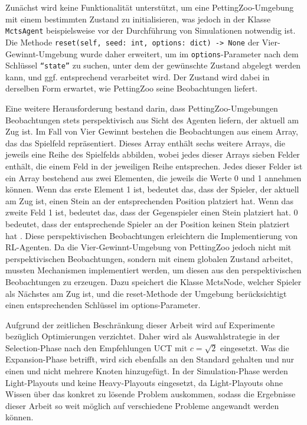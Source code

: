 Zunächst wird keine Funktionalität unterstützt, um eine PettingZoo-Umgebung mit einem bestimmten Zustand zu initialisieren, was jedoch in der Klasse \texttt{MctsAgent} beispielsweise vor der Durchführung von Simulationen notwendig ist. Die Methode \texttt{reset(self, seed: int, options: dict) -> None} der Vier-Gewinnt-Umgebung wurde daher erweitert, um im \texttt{options}-Parameter nach dem Schlüssel \texttt{``state''} zu suchen, unter dem der gewünschte Zustand abgelegt werden kann, und ggf. entsprechend verarbeitet wird. Der Zustand wird dabei in derselben Form erwartet, wie PettingZoo seine Beobachtungen liefert.

Eine weitere Herausforderung bestand darin, dass PettingZoo-Umgebungen Beobachtungen stets perspektivisch aus Sicht des Agenten liefern, der aktuell am Zug ist. Im Fall von Vier Gewinnt bestehen die Beobachtungen aus einem Array, das das Spielfeld repräsentiert. Dieses Array enthält sechs weitere Arrays, die jeweils eine Reihe des Spielfelds abbilden, wobei jedes dieser Arrays sieben Felder enthält, die einem Feld in der jeweiligen Reihe entsprechen. Jedes dieser Felder ist ein Array bestehend aus zwei Elementen, die jeweils die Werte 0 und 1 annehmen können. Wenn das erste Element 1 ist, bedeutet das, dass der Spieler, der aktuell am Zug ist, einen Stein an der entsprechenden Position platziert hat. Wenn das zweite Feld 1 ist, bedeutet das, dass der Gegenspieler einen Stein platziert hat. 0 bedeutet, dass der entsprechende Spieler an der Position keinen Stein platziert hat \cite{Farama.2025}. Diese perspektivischen Beobachtungen erleichtern die Implementierung von RL-Agenten. Da die Vier-Gewinnt-Umgebung von PettingZoo jedoch nicht mit perspektivischen Beobachtungen, sondern mit einem globalen Zustand arbeitet, mussten Mechanismen implementiert werden, um diesen aus den perspektivischen Beobachtungen zu erzeugen. Dazu speichert die Klasse MctsNode, welcher Spieler als Nächstes am Zug ist, und die reset-Methode der Umgebung berücksichtigt einen entsprechenden Schlüssel im options-Parameter.

Aufgrund der zeitlichen Beschränkung dieser Arbeit wird auf Experimente bezüglich Optimierungen verzichtet. Daher wird als Auswahlstrategie in der Selection-Phase nach den Empfehlungen UCT mit $c=\sqrt{2}$ eingesetzt. Was die Expansion-Phase betrifft, wird sich ebenfalls an den Standard gehalten und nur einen und nicht mehrere Knoten hinzugefügt. In der Simulation-Phase werden Light-Playouts und keine Heavy-Playouts eingesetzt, da Light-Playouts ohne Wissen über das konkret zu lösende Problem auskommen, sodass die Ergebnisse dieser Arbeit so weit möglich auf verschiedene Probleme angewandt werden können.

